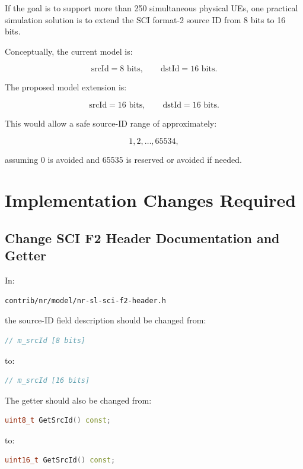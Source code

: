 \documentclass[11pt]{article}
\begin{document}
If the goal is to support more than 250 simultaneous physical UEs, one practical simulation solution is to extend the SCI format-2 source ID from 8 bits to 16 bits.

Conceptually, the current model is:

\[
\text{srcId}=8\text{ bits},
\qquad
\text{dstId}=16\text{ bits}.
\]

The proposed model extension is:

\[
\text{srcId}=16\text{ bits},
\qquad
\text{dstId}=16\text{ bits}.
\]

This would allow a safe source-ID range of approximately:

\[
1,2,\ldots,65534,
\]

assuming 0 is avoided and 65535 is reserved or avoided if needed.

\section{Implementation Changes Required}

\subsection{Change SCI F2 Header Documentation and Getter}

In:

\begin{lstlisting}
contrib/nr/model/nr-sl-sci-f2-header.h
\end{lstlisting}

the source-ID field description should be changed from:

\begin{lstlisting}[language=C++]
// m_srcId [8 bits]
\end{lstlisting}

to:

\begin{lstlisting}[language=C++]
// m_srcId [16 bits]
\end{lstlisting}

The getter should also be changed from:

\begin{lstlisting}[language=C++]
uint8_t GetSrcId() const;
\end{lstlisting}

to:

\begin{lstlisting}[language=C++]
uint16_t GetSrcId() const;
\end{lstlisting}
\end{document}
